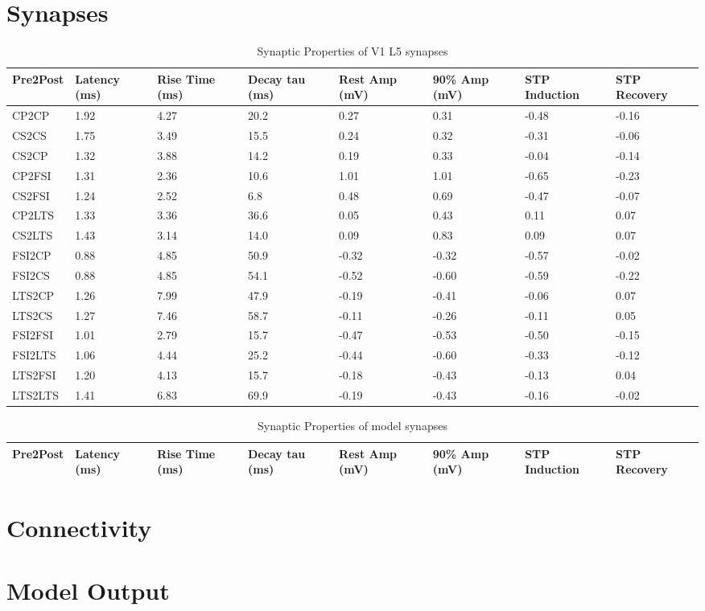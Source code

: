 \documentclass[12pt, letterpaper]{article}
\begin{document}
\section*{Synapses}
\begin{table}[H]
    \centering
    \caption{Synaptic Properties of V1 L5 synapses\cite{Campagnola2022}}
    \begin{tabularx}{\textwidth}{|X|X|X|X|X|X|X|X|}
      \hline
      Pre2Post & Latency (ms) & Rise Time (ms) & Decay tau (ms) & Rest Amp (mV) & 90\% Amp (mV) & STP Induction & STP Recovery \\ \hline
      CP2CP & 1.92 & 4.27 & 20.2 & 0.27 & 0.31 & -0.48 & -0.16 \\ \hline
      CS2CS & 1.75 & 3.49 & 15.5 & 0.24 & 0.32 & -0.31 & -0.06 \\ \hline
      CS2CP & 1.32 & 3.88 & 14.2 & 0.19 & 0.33 & -0.04 & -0.14 \\ \hline
      CP2FSI & 1.31 & 2.36 & 10.6 & 1.01 & 1.01 & -0.65 & -0.23 \\ \hline
      CS2FSI & 1.24 & 2.52 & 6.8 & 0.48 & 0.69 & -0.47 & -0.07 \\ \hline
      CP2LTS & 1.33 & 3.36 & 36.6 & 0.05 & 0.43 & 0.11 & 0.07 \\ \hline
      CS2LTS & 1.43 & 3.14 & 14.0 & 0.09 & 0.83 & 0.09 & 0.07 \\ \hline
      FSI2CP & 0.88 & 4.85 & 50.9 & -0.32 & -0.32 & -0.57 & -0.02 \\ \hline
      FSI2CS & 0.88 & 4.85 & 54.1 & -0.52 & -0.60 & -0.59 & -0.22 \\ \hline
      LTS2CP & 1.26 & 7.99 & 47.9 & -0.19 & -0.41 & -0.06 & 0.07 \\ \hline
      LTS2CS & 1.27 & 7.46 & 58.7 & -0.11 & -0.26 & -0.11 & 0.05 \\ \hline
      FSI2FSI & 1.01 & 2.79 & 15.7 & -0.47 & -0.53 & -0.50 & -0.15 \\ \hline
      FSI2LTS & 1.06 & 4.44 & 25.2 & -0.44 & -0.60 & -0.33 & -0.12 \\ \hline
      LTS2FSI & 1.20 & 4.13 & 15.7 & -0.18 & -0.43 & -0.13 & 0.04 \\ \hline
      LTS2LTS & 1.41 & 6.83 & 69.9 & -0.19 & -0.43 & -0.16 & -0.02 \\ \hline
    \end{tabularx}
    \label{table:syn-prop}
  \end{table}

  \begin{table}[H]
    \centering
    \caption{Synaptic Properties of model synapses}
    \begin{tabularx}{\textwidth}{|X|X|X|X|X|X|X|X|}
      \hline
      Pre2Post & Latency (ms) & Rise Time (ms) & Decay tau (ms) & Rest Amp (mV) & 90\% Amp (mV) & STP Induction & STP Recovery \\ \hline
    \end{tabularx}
    \label{table:syn-prop-model}
\end{table}



\section*{Connectivity}


\section*{Model Output}



\end{document}
